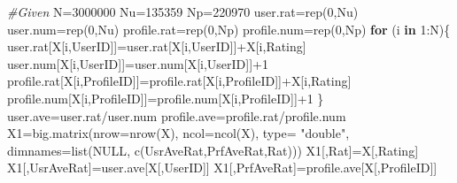 \documentclass[
]{article}
\newenvironment{Shaded}{\begin{snugshade}}{\end{snugshade}}
\newcommand{\AttributeTok}[1]{\textcolor[rgb]{0.77,0.63,0.00}{#1}}
\newcommand{\CommentTok}[1]{\textcolor[rgb]{0.56,0.35,0.01}{\textit{#1}}}
\newcommand{\ConstantTok}[1]{\textcolor[rgb]{0.00,0.00,0.00}{#1}}
\newcommand{\ControlFlowTok}[1]{\textcolor[rgb]{0.13,0.29,0.53}{\textbf{#1}}}
\newcommand{\DecValTok}[1]{\textcolor[rgb]{0.00,0.00,0.81}{#1}}
\newcommand{\FunctionTok}[1]{\textcolor[rgb]{0.00,0.00,0.00}{#1}}
\newcommand{\NormalTok}[1]{#1}
\newcommand{\OtherTok}[1]{\textcolor[rgb]{0.56,0.35,0.01}{#1}}
\newcommand{\SpecialCharTok}[1]{\textcolor[rgb]{0.00,0.00,0.00}{#1}}
\newcommand{\StringTok}[1]{\textcolor[rgb]{0.31,0.60,0.02}{#1}}
\begin{document}
\begin{Shaded}
\begin{Highlighting}[]
\CommentTok{\#Given}
\NormalTok{N}\OtherTok{=}\DecValTok{3000000}       
\NormalTok{Nu}\OtherTok{=}\DecValTok{135359}
\NormalTok{Np}\OtherTok{=}\DecValTok{220970}
\NormalTok{user.rat}\OtherTok{=}\FunctionTok{rep}\NormalTok{(}\DecValTok{0}\NormalTok{,Nu)}
\NormalTok{user.num}\OtherTok{=}\FunctionTok{rep}\NormalTok{(}\DecValTok{0}\NormalTok{,Nu)}
\NormalTok{profile.rat}\OtherTok{=}\FunctionTok{rep}\NormalTok{(}\DecValTok{0}\NormalTok{,Np)}
\NormalTok{profile.num}\OtherTok{=}\FunctionTok{rep}\NormalTok{(}\DecValTok{0}\NormalTok{,Np)}
\ControlFlowTok{for}\NormalTok{ (i }\ControlFlowTok{in} \DecValTok{1}\SpecialCharTok{:}\NormalTok{N)\{}
\NormalTok{    user.rat[X[i,}\StringTok{\textquotesingle{}UserID\textquotesingle{}}\NormalTok{]]}\OtherTok{=}\NormalTok{user.rat[X[i,}\StringTok{\textquotesingle{}UserID\textquotesingle{}}\NormalTok{]]}\SpecialCharTok{+}\NormalTok{X[i,}\StringTok{\textquotesingle{}Rating\textquotesingle{}}\NormalTok{]}
\NormalTok{    user.num[X[i,}\StringTok{\textquotesingle{}UserID\textquotesingle{}}\NormalTok{]]}\OtherTok{=}\NormalTok{user.num[X[i,}\StringTok{\textquotesingle{}UserID\textquotesingle{}}\NormalTok{]]}\SpecialCharTok{+}\DecValTok{1}
\NormalTok{    profile.rat[X[i,}\StringTok{\textquotesingle{}ProfileID\textquotesingle{}}\NormalTok{]]}\OtherTok{=}\NormalTok{profile.rat[X[i,}\StringTok{\textquotesingle{}ProfileID\textquotesingle{}}\NormalTok{]]}\SpecialCharTok{+}\NormalTok{X[i,}\StringTok{\textquotesingle{}Rating\textquotesingle{}}\NormalTok{]}
\NormalTok{    profile.num[X[i,}\StringTok{\textquotesingle{}ProfileID\textquotesingle{}}\NormalTok{]]}\OtherTok{=}\NormalTok{profile.num[X[i,}\StringTok{\textquotesingle{}ProfileID\textquotesingle{}}\NormalTok{]]}\SpecialCharTok{+}\DecValTok{1}
\NormalTok{\}}
\NormalTok{user.ave}\OtherTok{=}\NormalTok{user.rat}\SpecialCharTok{/}\NormalTok{user.num}
\NormalTok{profile.ave}\OtherTok{=}\NormalTok{profile.rat}\SpecialCharTok{/}\NormalTok{profile.num}
\NormalTok{X1}\OtherTok{=}\FunctionTok{big.matrix}\NormalTok{(}\AttributeTok{nrow=}\FunctionTok{nrow}\NormalTok{(X), }\AttributeTok{ncol=}\FunctionTok{ncol}\NormalTok{(X), }\AttributeTok{type=} \StringTok{"double"}\NormalTok{, }
              \AttributeTok{dimnames=}\FunctionTok{list}\NormalTok{(}\ConstantTok{NULL}\NormalTok{, }\FunctionTok{c}\NormalTok{(}\StringTok{\textquotesingle{}UsrAveRat\textquotesingle{}}\NormalTok{,}\StringTok{\textquotesingle{}PrfAveRat\textquotesingle{}}\NormalTok{,}\StringTok{\textquotesingle{}Rat\textquotesingle{}}\NormalTok{)))}
\NormalTok{X1[,}\StringTok{\textquotesingle{}Rat\textquotesingle{}}\NormalTok{]}\OtherTok{=}\NormalTok{X[,}\StringTok{\textquotesingle{}Rating\textquotesingle{}}\NormalTok{]}
\NormalTok{X1[,}\StringTok{\textquotesingle{}UsrAveRat\textquotesingle{}}\NormalTok{]}\OtherTok{=}\NormalTok{user.ave[X[,}\StringTok{\textquotesingle{}UserID\textquotesingle{}}\NormalTok{]]}
\NormalTok{X1[,}\StringTok{\textquotesingle{}PrfAveRat\textquotesingle{}}\NormalTok{]}\OtherTok{=}\NormalTok{profile.ave[X[,}\StringTok{\textquotesingle{}ProfileID\textquotesingle{}}\NormalTok{]]}


\end{Highlighting}
\end{Shaded}
\end{document}
